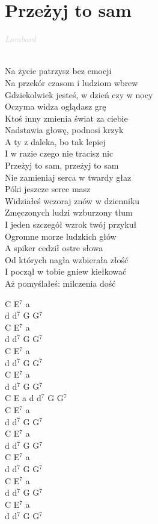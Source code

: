 \documentclass[a5paper, 10pt]{book}
\begin{document}
\section{Przeżyj to sam}\textcolor{lightgray}{\textit{Lombard}}\\~\\
\begin{minipage}[t]{0.75\textwidth}
Na życie patrzysz bez emocji\\
Na przekór czasom i ludziom wbrew\\
Gdziekolwiek jesteś, w dzień czy w nocy\\
Oczyma widza oglądasz grę\\
Ktoś inny zmienia świat za ciebie\\
Nadstawia głowę, podnosi krzyk\\
A ty z daleka, bo tak lepiej\\
I w razie czego nie tracisz nic\\

\hspace*{5mm}Przeżyj to sam, przeżyj to sam\\
\hspace*{5mm}Nie zamieniaj serca w twardy głaz\\
\hspace*{5mm}Póki jeszcze serce masz\\

Widziałeś wczoraj znów w dzienniku\\
Zmęczonych ludzi wzburzony tłum\\
I jeden szczegół wzrok twój przykuł\\
Ogromne morze ludzkich głów\\
A spiker cedził ostre słowa\\
Od których nagła wzbierała złość\\
I począł w tobie gniew kiełkować\\
Aż pomyślałeś: milczenia dość\\
\end{minipage}
\begin{minipage}[t]{0.25\textwidth}
C E$^7$ a\\
d d$^7$ G G$^7$\\
C E$^7$ a\\
d d$^7$ G G$^7$\\C E$^7$ a\\
d d$^7$ G G$^7$\\C E$^7$ a\\
d d$^7$ G G$^7$\\

C E a d d$^7$ G G$^7$\\
C E$^7$ a\\
d d$^7$ G G$^7$\\

C E$^7$ a\\
d d$^7$ G G$^7$\\
C E$^7$ a\\
d d$^7$ G G$^7$\\
C E$^7$ a\\
d d$^7$ G G$^7$\\
C E$^7$ a\\
d d$^7$ G G$^7$\\
\end{minipage}
\end{document}
